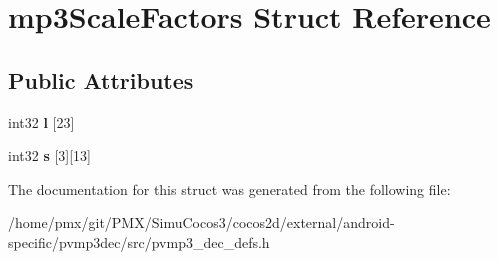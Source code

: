 \hypertarget{structmp3ScaleFactors}{}\section{mp3\+Scale\+Factors Struct Reference}
\label{structmp3ScaleFactors}
\subsection*{Public Attributes}
\begin{DoxyCompactItemize}
\item 
\mbox{\label{structmp3ScaleFactors_a041841be274f9d6945fc33ff5a484ce5}} 
int32 {\bfseries l} \mbox{[}23\mbox{]}
\item 
\mbox{\label{structmp3ScaleFactors_ab385684c85ff4e3264603937201d2397}} 
int32 {\bfseries s} \mbox{[}3\mbox{]}\mbox{[}13\mbox{]}
\end{DoxyCompactItemize}


The documentation for this struct was generated from the following file\+:\begin{DoxyCompactItemize}
\item 
/home/pmx/git/\+P\+M\+X/\+Simu\+Cocos3/cocos2d/external/android-\/specific/pvmp3dec/src/pvmp3\+\_\+dec\+\_\+defs.\+h\end{DoxyCompactItemize}
